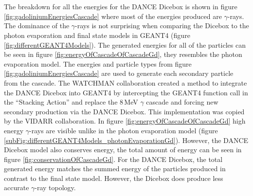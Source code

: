 \\\\The breakdown for all the energies for the DANCE Dicebox is shown in figure \ref{fig:gadoliniumEnergiesCascade} where most of the energies produced are $\gamma$-rays. The dominance of the $\gamma$-rays is not surprising when comparing the Dicebox to the photon evaporation and final state models in GEANT4 (figure \ref{fig:differentGEANT4Models}). The generated energies for all of the particles can be seen in figure \ref{fig:energyOfCascadeOfCascadeGd}, they resembles the photon evaporation model. The energies and particle types from figure \ref{fig:gadoliniumEnergiesCascade} are used to generate each secondary particle from the cascade. The WATCHMAN collaboration created a method to integrate the DANCE Dicebox into GEANT4 by intercepting the GEANT4 function call in the ``Stacking Action'' and replace the 8\,MeV $\gamma$ cascade and forcing new secondary production via the DANCE Dicebox. This implementation was copied by the VIDARR collaboration. In figure \ref{fig:energyOfCascadeOfCascadeGd} high energy $\gamma$-rays are visible unlike in the photon evaporation model (figure \ref{subFig:differentGEANT4Models_photonEvaporationGd}). However, the DANCE Dicebox model also conserves energy, the total amount of energy can be seen in figure  \ref{fig:conservationOfCascadeGd}. For the DANCE Dicebox, the total generated energy matches the summed energy of the particles produced in contrast to the final state model. However, the Dicebox does produce less accurate $\gamma$-ray topology.

